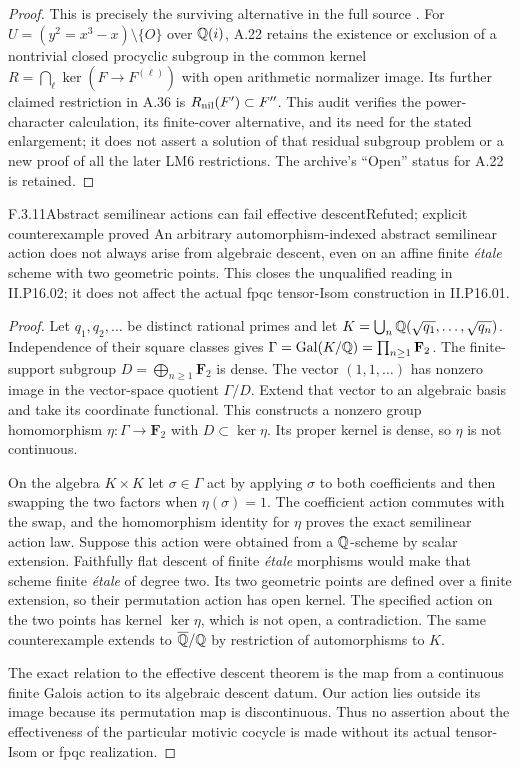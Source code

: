 \begin{proof}
This is precisely the surviving alternative in the full
source \cite[A.50, pp.33--34; A.22, pp.16--17]{AuditLM6Full2026}.
For $U=(y^2=x^3-x)\setminus\{O\}$ over $\mathbb Q(i)$, A.22
retains the existence or exclusion of a nontrivial closed
procyclic subgroup in the common kernel
$R=\bigcap_\ell\ker(F\to F^{(\ell)})$ with open arithmetic
normalizer image. Its further claimed restriction in A.36
is $R_{\rm nil}(F')\subset F''$. This audit verifies the
power-character calculation, its finite-cover alternative,
and its need for the stated enlargement; it does not assert
a solution of that residual subgroup problem or a new proof
of all the later LM6 restrictions. The archive's ``Open''
status for A.22 is retained.
\end{proof}

\begin{result}{F.3.11}{Abstract semilinear actions can fail effective descent}{Refuted; explicit counterexample proved}
An arbitrary automorphism-indexed abstract semilinear action
does not always arise from algebraic descent, even on an
affine finite \emph{\'etale} scheme with two geometric points.
This closes the unqualified reading in II.P16.02; it does
not affect the actual fpqc tensor-Isom construction in
II.P16.01.
\end{result}
\begin{proof}
Let $q_1,q_2,\ldots$ be distinct rational primes and let
$K=\bigcup_n\mathbb Q(\sqrt{q_1},\ldots,\sqrt{q_n})$.
Independence of their square classes gives
$\Gamma=\operatorname{Gal}(K/\mathbb Q)=\prod_{n\ge1}\mathbf F_2$.
The finite-support subgroup $D=\bigoplus_{n\ge1}\mathbf F_2$
is dense. The vector $(1,1,\ldots)$ has nonzero image in
the vector-space quotient $\Gamma/D$. Extend that vector
to an algebraic basis and take its coordinate functional.
This constructs a nonzero group homomorphism
$\eta:\Gamma\to\mathbf F_2$ with $D\subset\ker\eta$.
Its proper kernel is dense, so $\eta$ is not continuous.

On the algebra $K\times K$ let $\sigma\in\Gamma$ act by
applying $\sigma$ to both coefficients and then swapping the
two factors when $\eta(\sigma)=1$. The coefficient action
commutes with the swap, and the homomorphism identity for
$\eta$ proves the exact semilinear action law. Suppose this
action were obtained from a $\mathbb Q$-scheme by scalar extension.
Faithfully flat descent of finite \emph{\'etale} morphisms
would make that scheme finite \emph{\'etale} of degree two.
Its two geometric points are defined over a finite extension,
so their permutation action has open kernel. The specified
action on the two points has kernel $\ker\eta$, which is
not open, a contradiction. The same counterexample extends
to $\overline{\mathbb Q}/\mathbb Q$ by restriction of automorphisms to $K$.

The exact relation to the effective descent theorem is the
map from a continuous finite Galois action to its algebraic
descent datum. Our action lies outside its image because its
permutation map is discontinuous. Thus no assertion about
the effectiveness of the particular motivic cocycle is made
without its actual tensor-Isom or fpqc realization.
\end{proof}

